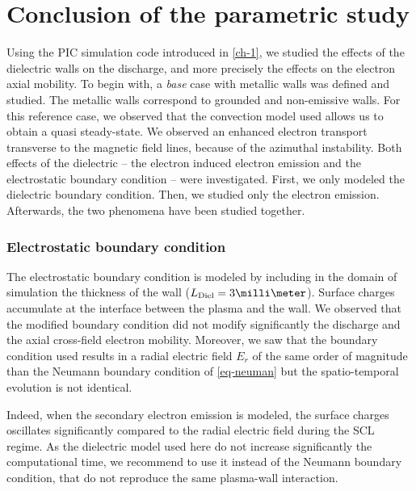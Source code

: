 
\section{Conclusion of the parametric study}
  \label{sec-conclusion_ch2}
  
  Using the \ac{PIC} simulation code introduced in \cref{ch-1}, we studied the effects of the dielectric walls on the discharge, and more precisely the effects on the electron axial mobility.
  To begin with, a \emph{base} case with metallic walls was defined and studied.
  The metallic walls correspond to grounded and non-emissive walls.
  For this reference case, we observed that the convection model used allows us to obtain a quasi steady-state.
  We observed an enhanced electron transport transverse to the magnetic field lines, because of the azimuthal instability.
  Both effects of the dielectric -- the electron induced electron emission and the electrostatic boundary condition -- were investigated.
  First, we  only modeled the dielectric boundary condition. Then, we studied only the electron emission. Afterwards, the two phenomena have been studied together.
  
  \subsubsection*{Electrostatic boundary condition}
  
  The electrostatic boundary condition is modeled by including in the domain of simulation the thickness of the wall ($L_{\rm Diel} = 3 \milli\meter$).
  Surface charges accumulate at the interface between the plasma and the wall.
  We observed that the modified boundary condition did not modify significantly the discharge and the axial cross-field electron mobility.
  Moreover, we saw that the boundary condition used results in a radial electric field $E_r$ of the same order of magnitude than the Neumann boundary condition of \cref{eq-neuman} but the spatio-temporal evolution is not identical.
  
  Indeed, when the secondary electron emission is modeled, the surface charges oscillates significantly compared to the radial electric field during the \ac{SCL} regime.
  As the dielectric model used here do not increase significantly the computational time, we recommend to use it instead of the Neumann boundary condition, that do not reproduce the same plasma-wall interaction.
  

